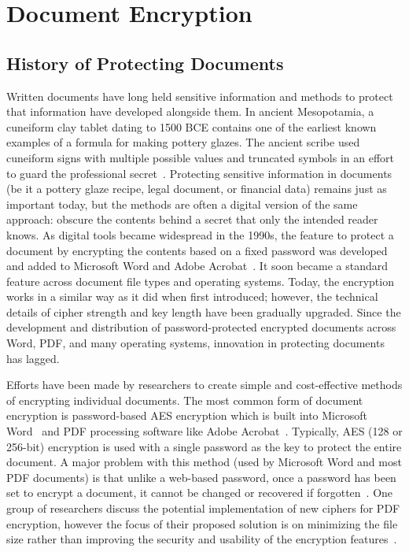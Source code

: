 

\section{Document Encryption}
\label{sec:doc-encryption}

\subsection{History of Protecting Documents}
\label{sec:doc-history}

Written documents have long held sensitive information and methods to protect that information have developed alongside them. In ancient Mesopotamia, a cuneiform clay tablet dating to 1500 BCE contains one of the earliest known examples of a formula for making pottery glazes. The ancient scribe used cuneiform signs with multiple possible values and truncated symbols in an effort to guard the professional secret~\cite{kahn_codebreakers_1996}. Protecting sensitive information in documents (be it a pottery glaze recipe, legal document, or financial data) remains just as important today, but the methods are often a digital version of the same approach: obscure the contents behind a secret that only the intended reader knows. As digital tools became widespread in the 1990s, the feature to protect a document by encrypting the contents based on a fixed password was developed and added to Microsoft Word and Adobe Acrobat~\cite{adobe_pdf_timeline}. It soon became a standard feature across document file types and operating systems. Today, the encryption works in a similar way as it did when first introduced; however, the technical details of cipher strength and key length have been gradually upgraded. Since the development and distribution of password-protected encrypted documents across Word, PDF, and many operating systems, innovation in protecting documents has lagged.

Efforts have been made by researchers to create simple and cost-effective methods of encrypting individual documents. The most common form of document encryption is password-based AES encryption which is built into Microsoft Word~\cite{microsoft_word_encryption} and PDF processing software like Adobe Acrobat~\cite{adobe_pdf_encryption}. Typically, AES (128 or 256-bit) encryption is used with a single password as the key to protect the entire document. A major problem with this method (used by Microsoft Word and most PDF documents) is that unlike a web-based password, once a password has been set to encrypt a document, it cannot be changed or recovered if forgotten~\cite{microsoft_forgot_password}. One group of researchers discuss the potential implementation of new ciphers for PDF encryption, however the focus of their proposed solution is on minimizing the file size rather than improving the security and usability of the encryption features~\cite{muller_practical_2019}.

